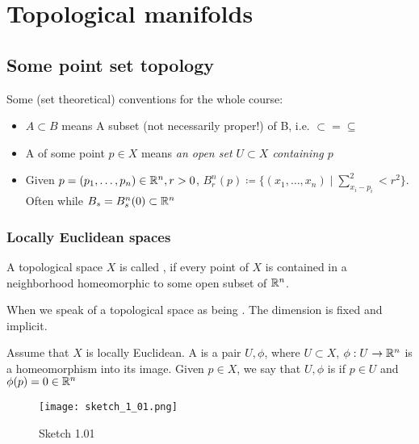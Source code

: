 \chapter{Topological manifolds}

\section{Some point set topology}

Some (set theoretical) conventions for the whole course:
\begin{itemize}
    \item \(A\subset B\) means A subset (not necessarily proper!) of B, i.e. \(\subset =\subseteq\)
    \item A  of some point \(p\in X\) means \textit{an open set \(U\subset X\) containing \(p\)}
    \item Given \(p=(p_1,\dots,p_n)\in\mathbb{R}^n,r>0\), \(B_r^n(p)\coloneqq \{(x_1,\dots,x_n)\mid \sum_{x_i-p_i}^2<r^2\}\). Often while \(B_s=B_s^n(0)\subset\mathbb{R}^n\)
\end{itemize}

\subsection{Locally Euclidean spaces}

\begin{definition*}
    A topological space \(X\) is called , if every 
    point of \(X\) is contained in a neighborhood homeomorphic to some open subset of $\mathbb{R}^n$. 
\end{definition*}

\begin{remark}
    When we speak of a topological space as being . The dimension is fixed and implicit.
\end{remark}

\begin{definition*}
    Assume that \(X\) is locally Euclidean. A  is a pair \(U,\phi\), where \(U\subset X\),
    \(\phi:U\to\mathbb{R}^n\) is a homeomorphism into its image. Given \(p\in X\), we say that \(U,\phi\) is 
     if \(p\in U\) and \(\phi(p)=0\in\mathbb{R}^n\)
    \begin{figure}[H]
        \centering
        \texttt{[image: sketch\_1\_01.png]}
        \caption{Sketch 1.01}
    \end{figure}
\end{definition*}

